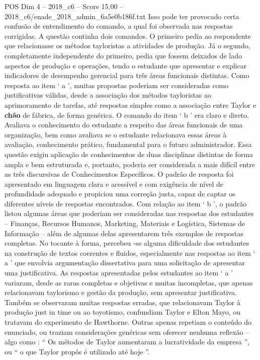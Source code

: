\begin{textsample}{POS Dim 4 – 2018\_c6 – Score 15.00 – 2018\_c6/enade\_2018\_admin\_6a5e0b186f.txt}
Isso pode ter provocado certa confusão de entendimento do comando, a qual foi observada nas respostas corrigidas.
A questão continha dois comandos.
O primeiro pedia ao respondente que relacionasse os métodos tayloristas a atividades de produção.
Já o segundo, completamente independente do primeiro, pedia que fossem deixados de lado aspectos de produção e operações, tendo o estudante que apresentar e explicar indicadores de desempenho gerencial para três áreas funcionais distintas.
Como resposta ao item ‘ a ’, muitas propostas poderiam ser consideradas como justificativas válidas, desde a associação dos métodos tayloristas ao aprimoramento de tarefas, até respostas simples como a associação entre Taylor e \textbf{chão} de fábrica, de forma genérica.
O comando do item ‘ b ’ era claro e direto.
Avaliava o conhecimento do estudante a respeito das áreas funcionais de uma organização, bem como avaliava se o estudante relacionava essas áreas à avaliação, conhecimento prático, fundamental para o futuro administrador.
Essa questão exigiu aplicação de conhecimentos de duas disciplinas distintas de forma ampla e bem estruturada e, portanto, poderia ser considerada a mais difícil entre as três discursivas de Conhecimentos Específicos.
O padrão de resposta foi apresentado em linguagem clara e acessível e com exigência de nível de profundidade adequado e propiciou uma correção justa, capaz de captar os diferentes níveis de respostas encontrados.
Com relação ao item ‘ b ’, o padrão listou algumas áreas que poderiam ser consideradas nas respostas dos estudantes – Finanças, Recursos Humanos, Marketing, Materiais e Logística, Sistemas de Informação – além de algumas delas apresentarem três exemplos de respostas completas.
No tocante à forma, percebeu -se alguma dificuldade dos estudantes na construção de textos coerentes e fluidos, especialmente nas respostas ao item ‘ a ’ que envolvia argumentação dissertativa para uma solicitação de apresentar uma justificativa.
As respostas apresentadas pelos estudantes ao item ‘ a ’ variaram, desde as raras completas e objetivas e muitas incompletas, que apenas relacionavam taylorismo e gestão da produção, sem apresentar justificativa.
Também se observaram muitas respostas erradas, que relacionavam Taylor à produção just in time ou ao toyotismo, confundiam Taylor e Elton Mayo, ou tratavam do experimento de Hawthorne.
Outras apenas repetiam o conteúdo do enunciado, ou traziam considerações genéricas sem oferecer nenhuma reflexão – algo como : “ Os métodos de Taylor aumentaram a lucratividade da empresa ”, ou “ o que Taylor propôs é utilizado até hoje ”.

\end{textsample}
